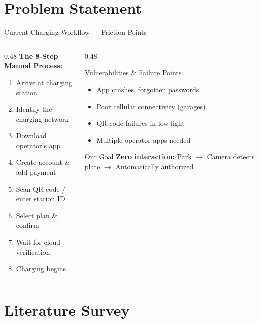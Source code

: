 \documentclass[aspectratio=169,11pt]{beamer}
\begin{document}
\section{Problem Statement}

\begin{frame}{Current Charging Workflow --- Friction Points}
\begin{columns}
\begin{column}{0.48\textwidth}
\textbf{The 8-Step Manual Process:}
\begin{enumerate}
    \item Arrive at charging station
    \item Identify the charging network
    \item Download operator's app
    \item Create account \& add payment
    \item Scan QR code / enter station ID
    \item Select plan \& confirm
    \item Wait for cloud verification
    \item Charging begins
\end{enumerate}
\end{column}
\begin{column}{0.48\textwidth}
\begin{alertblock}{Vulnerabilities \& Failure Points}
\begin{itemize}
    \item App crashes, forgotten passwords
    \item Poor cellular connectivity (garages)
    \item QR code failures in low light
    \item Multiple operator apps needed
\end{itemize}
\end{alertblock}
\vspace{0.3em}
\begin{exampleblock}{Our Goal}
\textbf{Zero interaction:} Park $\to$ Camera detects plate $\to$ Automatically authorized
\end{exampleblock}
\end{column}
\end{columns}
\end{frame}

\section{Literature Survey}
\end{document}
